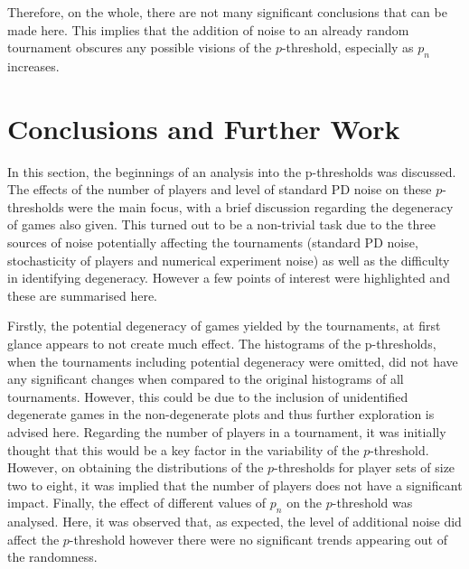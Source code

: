 Therefore, on the whole, there
are not many significant conclusions that can be made here. This implies that
the addition of noise to an already random tournament obscures any possible
visions of the \(p\)-threshold, especially as \(p_{n}\) increases.


\section{Conclusions and Further Work}\label{sec:Conclusions_and_Further_Work}
In this section, the beginnings of an analysis into the p-thresholds was
discussed. The effects of the number of players and level of standard PD noise on
these \(p\)-thresholds were the main focus, with a brief discussion regarding the
degeneracy of games also given. This turned out to be a non-trivial task due to
the three sources of noise potentially affecting the tournaments (standard PD
noise, stochasticity of players and numerical experiment noise) as well as the
difficulty in identifying degeneracy. However a few points of interest were highlighted and these are
summarised here. 

Firstly, the potential degeneracy of games yielded by the tournaments, at first
glance appears to not create much effect. The histograms of the p-thresholds, when the
tournaments including potential degeneracy were omitted, did not have any
significant changes when compared to the original histograms of all tournaments.
However, this could be due to the inclusion of unidentified degenerate games in
the non-degenerate plots and thus further exploration is advised here. Regarding the number of players in
a tournament, it was initially thought that this would be a key factor in
the variability of the \(p\)-threshold. However, on obtaining the distributions of
the \(p\)-thresholds for player sets of size two
to eight, it was implied that the number of players does not have a significant
impact. Finally, the effect of different values of \(p_{n}\) on
the \(p\)-threshold was analysed. Here, it was observed that, as expected, the level
of additional noise did affect the \(p\)-threshold however there were no significant
trends appearing out of the randomness.

